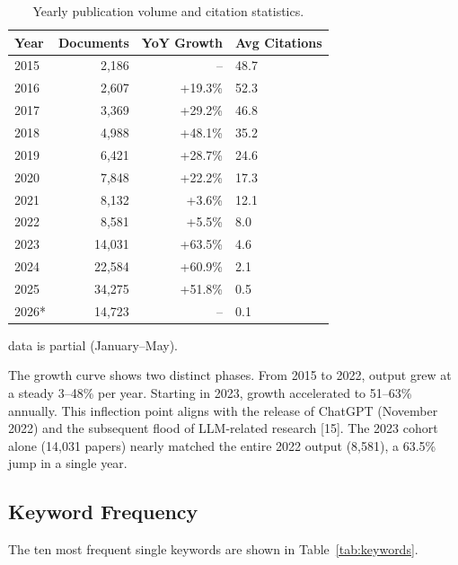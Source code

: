 \documentclass[11pt]{article}
\begin{document}
\begin{table}[h]
\centering
\caption{Yearly publication volume and citation statistics.}
\label{tab:yearly}
\begin{tabular}{@{}lrrl@{}}
\toprule
Year & Documents & YoY Growth & Avg Citations \\
\midrule
2015 & 2,186 & -- & 48.7 \\
2016 & 2,607 & +19.3\% & 52.3 \\
2017 & 3,369 & +29.2\% & 46.8 \\
2018 & 4,988 & +48.1\% & 35.2 \\
2019 & 6,421 & +28.7\% & 24.6 \\
2020 & 7,848 & +22.2\% & 17.3 \\
2021 & 8,132 & +3.6\% & 12.1 \\
2022 & 8,581 & +5.5\% & 8.0 \\
2023 & 14,031 & +63.5\% & 4.6 \\
2024 & 22,584 & +60.9\% & 2.1 \\
2025 & 34,275 & +51.8\% & 0.5 \\
2026* & 14,723 & -- & 0.1 \\
\bottomrule
\end{tabular}
\end{table}

 data is partial (January--May).

The growth curve shows two distinct phases. From 2015 to 2022, output grew at a steady 3--48\% per year. Starting in 2023, growth accelerated to 51--63\% annually. This inflection point aligns with the release of ChatGPT (November 2022) and the subsequent flood of LLM-related research [15]. The 2023 cohort alone (14,031 papers) nearly matched the entire 2022 output (8,581), a 63.5\% jump in a single year.

\subsection{Keyword Frequency}

The ten most frequent single keywords are shown in Table~\ref{tab:keywords}.
\end{document}
